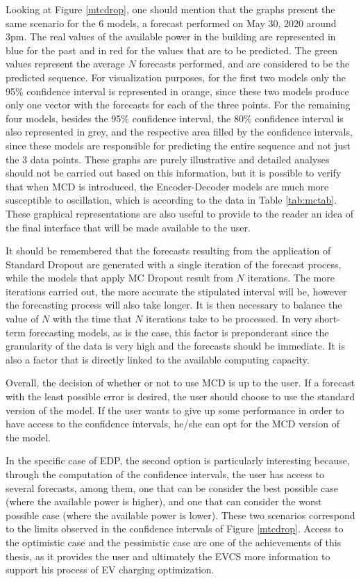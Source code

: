 Looking at Figure \ref{mtcdrop}, one should mention that the graphs present the same scenario for the 6 models, a forecast performed on May 30, 2020 around 3pm. The real values of the available power in the building are represented in blue for the past and in red for the values that are to be predicted. The green values represent the average $N$ forecasts performed, and are considered to be the predicted sequence. For visualization purposes, for the first two models only the 95\% confidence interval is represented in orange, since these two models produce only one vector with the forecasts for each of the three points. For the remaining four models, besides the 95\% confidence interval, the 80\% confidence interval is also represented in grey, and the respective area filled by the confidence intervals, since these models are responsible for predicting the entire sequence and not just the 3 data points. These graphs are purely illustrative and detailed analyses should not be carried out based on this information, but it is possible to verify that when \ac{MCD} is introduced, the Encoder-Decoder models are much more susceptible to oscillation, which is according to the data in Table \ref{tab:mctab}. These graphical representations are also useful to provide to the reader an idea of the final interface that will be made available to the user. 

It should be remembered that the forecasts resulting from the application of Standard Dropout are generated with a single iteration of the forecast process, while the models that apply MC Dropout result from $N$ iterations. The more iterations carried out, the more accurate the stipulated interval will be, however the forecasting process will also take longer. It is then necessary to balance the value of $N$ with the time that $N$ iterations take to be processed. In very short-term forecasting models, as is the case, this factor is preponderant since the granularity of the data is very high and the forecasts should be immediate. It is also a factor that is directly linked to the available computing capacity.


Overall, the decision of whether or not to use \ac{MCD} is up to the user. If a forecast with the least possible error is desired, the user should choose to use the standard version of the model. If the user wants to give up some performance in order to have access to the confidence intervals, he/she can opt for the \ac{MCD} version of the model. 

In the specific case of \ac{EDP}, the second option is particularly interesting because, through the computation of the confidence intervals, the user has access to several forecasts, among them, one that can be consider the best possible case (where the available power is higher), and one that can consider the worst possible case (where the available power is lower). These two scenarios correspond to the limits observed in the confidence intervals of Figure \ref{mtcdrop}. Access to the optimistic case and the pessimistic case are one of the achievements of this thesis, as it provides the user and ultimately the \ac{EVCS} more information to support his process of \ac{EV} charging optimization.

